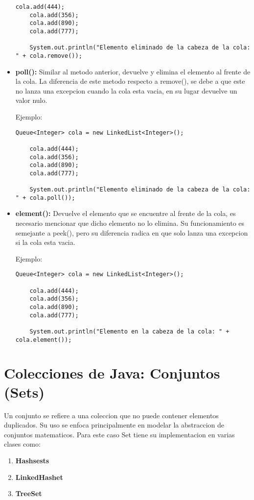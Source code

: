 \documentclass[12pt, letterpaper]{article} %
\begin{document}
\begin{itemize}
\begin{lstlisting}[frame=single]
    cola.add(444);
    cola.add(356);
    cola.add(890);
    cola.add(777);

    System.out.println("Elemento eliminado de la cabeza de la cola: " + cola.remove());
    \end{lstlisting}

    \item \textbf{poll():} Similar al metodo anterior, devuelve y elimina el elemento al frente de la cola. La diferencia de este metodo respecto a remove(), se debe a que este no lanza una excepcion cuando la cola esta vacia, en su lugar devuelve un valor nulo.
    
    Ejemplo:
    \lstset{language = Java, breaklines=true, basicstyle=\footnotesize}
    \begin{lstlisting}[frame=single]
    Queue<Integer> cola = new LinkedList<Integer>();

    cola.add(444);
    cola.add(356);
    cola.add(890);
    cola.add(777);

    System.out.println("Elemento eliminado de la cabeza de la cola: " + cola.poll());
    \end{lstlisting}

    \item \textbf{element():} Devuelve el elemento que se encuentre al frente de la cola, es necesario mencionar que dicho elemento no lo elimina. Su funcionamiento es semejante a peek(), pero su diferencia radica en que solo lanza una excepcion si la cola esta vacia.
    
    Ejemplo:
    \lstset{language = Java, breaklines=true, basicstyle=\footnotesize}
    \begin{lstlisting}[frame=single]
    Queue<Integer> cola = new LinkedList<Integer>();

    cola.add(444);
    cola.add(356);
    cola.add(890);
    cola.add(777);
    
    System.out.println("Elemento en la cabeza de la cola: " + cola.element());
    \end{lstlisting}
\end{itemize}

\section{Colecciones de Java: Conjuntos (Sets)}
Un conjunto se refiere a una coleccion que no puede contener elementos duplicados. Su uso se enfoca principalmente en modelar la abstraccion de conjuntos matematicos. Para este caso Set tiene su implementacion en varias clases como:
\begin{enumerate}
    \item \textbf{Hashsests}
    \item \textbf{LinkedHashet}
    \item \textbf{TreeSet}
\end{enumerate}
\end{document}
